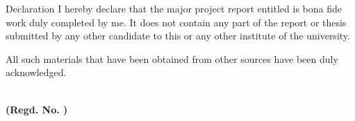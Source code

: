 \begin{letterheadpage}{Declaration}
\noindent I hereby declare that the major project report entitled \textbf{\textit{\docTitle}} is bona fide work duly completed by me. It does not contain any part of the report or thesis submitted by any other candidate to this or any other institute of the university.

All such materials that have been obtained from other sources have been duly acknowledged.

\vspace{1cm}
\begin{flushright}
    \textbf{\studentName} \\
    \textbf{(Regd. No. \texttt{\studentRoll})}
\end{flushright}
\end{letterheadpage}
